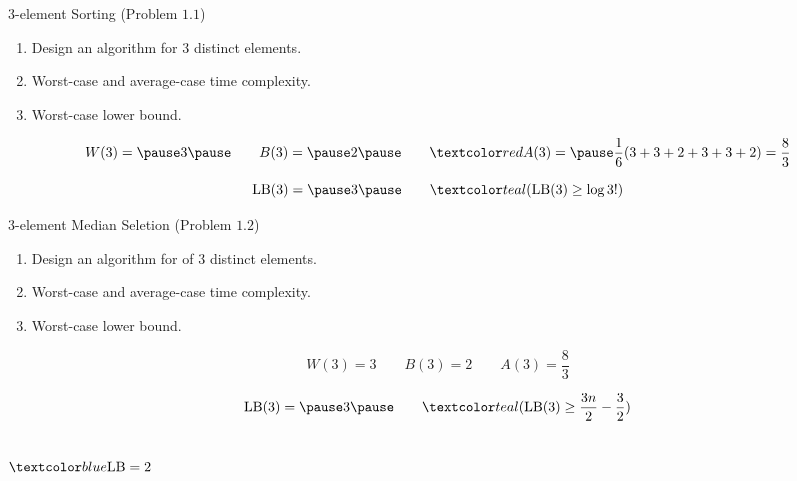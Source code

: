 \begin{frame}{}
  \begin{exampleblock}{$3$-element Sorting (Problem $1.1$)}
    \begin{enumerate}[(1)]
      \item Design an algorithm for  $3$ distinct elements.
      \item Worst-case and average-case time complexity.
      \item Worst-case lower bound.
    \end{enumerate}
  \end{exampleblock}

  \pause

  \pause
  \vspace{-0.30cm}
  \[
    W(3) =\pause 3 \pause\qquad B(3) =\pause 2 \pause\qquad \red{A(3)} = \pause \frac{1}{6} (3+3+2+3+3+2) = \frac{8}{3}
  \]

  \pause
  \vspace{-0.60cm}
  \[
    \text{LB}(3) =\pause 3 \pause \qquad \teal{(\text{LB}(3) \ge \log 3!)}
  \]
\end{frame}

\begin{frame}{}
  \begin{exampleblock}{$3$-element Median Seletion (Problem $1.2$)}
    \begin{enumerate}[(1)]
      \item Design an algorithm for  of $3$ distinct elements.
      \item Worst-case and average-case time complexity.
      \item Worst-case lower bound.
    \end{enumerate}
  \end{exampleblock}

  \pause

  \pause
  \vspace{-0.30cm}
  \[
    W(3) = 3 \qquad B(3) = 2 \qquad A(3) = \frac{8}{3}
  \]

  \pause
  \vspace{-0.30cm}
  \[
    \text{LB}(3) =\pause 3 \pause \qquad \teal{(\text{LB}(3) \ge \frac{3n}{2} - \frac{3}{2})}
  \]
\end{frame}

\begin{frame}{}
  \begin{columns}
      \[
	\blue{\text{LB} = 2}
      \]
      \pause
      
  \end{columns}

  \pause
  \vspace{0.60cm}
  \centerline{}
\end{frame}

